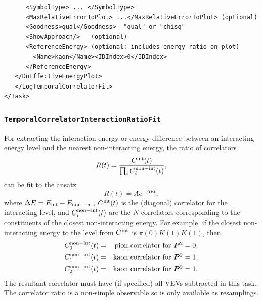 \documentclass[12pt]{article}
\newcommand{\vb}{\texttt}
\begin{document}
\begin{verbatim}
      <SymbolType> ... </SymbolType>                                     
      <MaxRelativeErrorToPlot> ...</MaxRelativeErrorToPlot> (optional)   
      <Goodness>qual</Goodness>  "qual" or "chisq"                       
      <ShowApproach/>   (optional)                                       
      <ReferenceEnergy> (optional: includes energy ratio on plot)        
        <Name>kaon</Name><IDIndex>0</IDIndex>                            
      </ReferenceEnergy>                                                 
   </DoEffectiveEnergyPlot>                                              
   </LogTemporalCorrelatorFit>                                           
</Task> 
\end{verbatim}

\subsubsection{\vb{TemporalCorrelatorInteractionRatioFit}}

For extracting the interaction energy or energy difference between an 
interacting energy level and the nearest non-interacting energy, the ratio
of correlators
\[
   R(t) =  \frac{C^{\rm int}(t)}{\prod_i C^{\rm non-int}_i(t)},
\]
can be fit to the ansatz  
\[
     R(t) = A e^{-\Delta E t},
\]
where $\Delta E=E_{\rm int} - E_{\rm non-int}$,
$C^{\rm int}(t)$ is the (diagonal) correlator for the interacting level,
and $C^{\rm non-int}_i(t)$ are the $N$ correlators corresponding to 
the constituents of the closest non-interacting energy.
For example, if the closest non-interacting energy to the level from
$C^{\rm int}$ is $\pi(0)K(1)K(1)$, then
\begin{eqnarray*}
     C^{\rm non-int}_0(t) &=& \mbox{pion correlator for $\bm{P}^2=0$},\\
     C^{\rm non-int}_1(t) &=& \mbox{kaon correlator for $\bm{P}^2=1$},\\
     C^{\rm non-int}_2(t) &=& \mbox{kaon correlator for $\bm{P}^2=1$}.
\end{eqnarray*}
The resultant correlator must have (if specified) all VEVs subtracted 
in this task.  The correlator ratio is a non-simple observable so is 
only available as resamplings.
\end{document}
